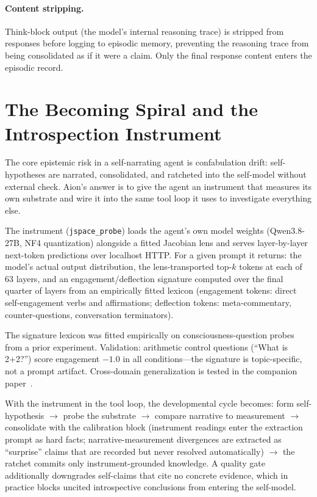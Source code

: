 \documentclass[11pt,a4paper]{article}
\begin{document}
\paragraph{Content stripping.} Think-block output (the model's internal reasoning trace) is stripped from responses before logging to episodic memory, preventing the reasoning trace from being consolidated as if it were a claim. Only the final response content enters the episodic record.

\section{The Becoming Spiral and the Introspection Instrument}
\label{sec:spiral}

The core epistemic risk in a self-narrating agent is confabulation drift: self-hypotheses are narrated, consolidated, and ratcheted into the self-model without external check. Aion's answer is to give the agent an instrument that measures its own substrate and wire it into the same tool loop it uses to investigate everything else.

The instrument (\texttt{jspace\_probe}) loads the agent's own model weights (Qwen3.8-27B, NF4 quantization) alongside a fitted Jacobian lens and serves layer-by-layer next-token predictions over localhost HTTP. For a given prompt it returns: the model's actual output distribution, the lens-transported top-$k$ tokens at each of 63 layers, and an engagement/deflection signature computed over the final quarter of layers from an empirically fitted lexicon (engagement tokens: direct self-engagement verbs and affirmations; deflection tokens: meta-commentary, counter-questions, conversation terminators).

The signature lexicon was fitted empirically on consciousness-question probes from a prior experiment. Validation: arithmetic control questions (``What is 2+2?'') score engagement $-1.0$ in all conditions---the signature is topic-specific, not a prompt artifact. Cross-domain generalization is tested in the companion paper~\cite{paper2}.

With the instrument in the tool loop, the developmental cycle becomes: form self-hypothesis $\to$ probe the substrate $\to$ compare narrative to measurement $\to$ consolidate with the calibration block (instrument readings enter the extraction prompt as hard facts; narrative-measurement divergences are extracted as ``surprise'' claims that are recorded but never resolved automatically) $\to$ the ratchet commits only instrument-grounded knowledge. A quality gate additionally downgrades self-claims that cite no concrete evidence, which in practice blocks uncited introspective conclusions from entering the self-model.
\end{document}
